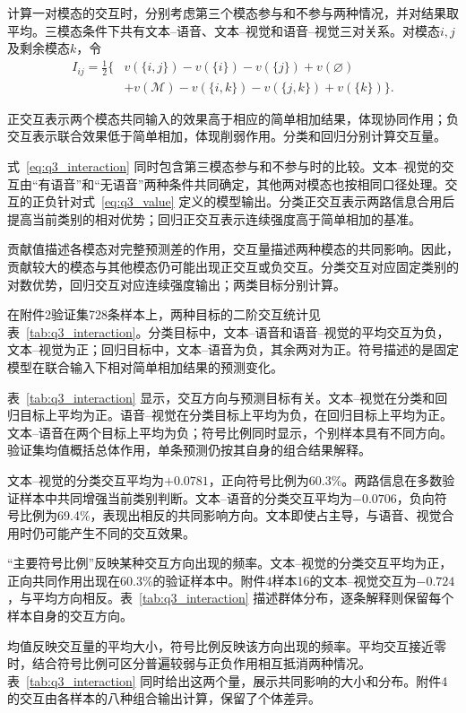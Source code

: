 计算一对模态的交互时，分别考虑第三个模态参与和不参与两种情况，并对结果取平均。三模态条件下共有文本--语音、文本--视觉和语音--视觉三对关系。对模态$i,j$及剩余模态$k$，令
\begin{equation}
\begin{aligned}
I_{ij}=\tfrac12\{&
v(\{i,j\})-v(\{i\})-v(\{j\})+v(\varnothing)\\
&+v(\mathcal M)-v(\{i,k\})-v(\{j,k\})+v(\{k\})\}.
\end{aligned}
\label{eq:q3_interaction}
\end{equation}

正交互表示两个模态共同输入的效果高于相应的简单相加结果，体现协同作用；负交互表示联合效果低于简单相加，体现削弱作用。分类和回归分别计算交互量。

式~\eqref{eq:q3_interaction} 同时包含第三模态参与和不参与时的比较。文本--视觉的交互由“有语音”和“无语音”两种条件共同确定，其他两对模态也按相同口径处理。交互的正负针对式~\eqref{eq:q3_value} 定义的模型输出。分类正交互表示两路信息合用后提高当前类别的相对优势；回归正交互表示连续强度高于简单相加的基准。

贡献值描述各模态对完整预测差的作用，交互量描述两种模态的共同影响。因此，贡献较大的模态与其他模态仍可能出现正交互或负交互。分类交互对应固定类别的对数优势，回归交互对应连续强度输出；两类目标分别计算。

在附件2验证集728条样本上，两种目标的二阶交互统计见表~\ref{tab:q3_interaction}。分类目标中，文本--语音和语音--视觉的平均交互为负，文本--视觉为正；回归目标中，文本--语音为负，其余两对为正。符号描述的是固定模型在联合输入下相对简单相加结果的预测变化。

表~\ref{tab:q3_interaction} 显示，交互方向与预测目标有关。文本--视觉在分类和回归目标上平均为正。语音--视觉在分类目标上平均为负，在回归目标上平均为正。文本--语音在两个目标上平均为负；符号比例同时显示，个别样本具有不同方向。验证集均值概括总体作用，单条预测仍按其自身的组合结果解释。

文本--视觉的分类交互平均为$+0.0781$，正向符号比例为60.3\%。两路信息在多数验证样本中共同增强当前类别判断。文本--语音的分类交互平均为$-0.0706$，负向符号比例为69.4\%，表现出相反的共同影响方向。文本即使占主导，与语音、视觉合用时仍可能产生不同的交互效果。

“主要符号比例”反映某种交互方向出现的频率。文本--视觉的分类交互平均为正，正向共同作用出现在60.3\%的验证样本中。附件4样本16的文本--视觉交互为$-0.724$，与平均方向相反。表~\ref{tab:q3_interaction} 描述群体分布，逐条解释则保留每个样本自身的交互方向。

均值反映交互量的平均大小，符号比例反映该方向出现的频率。平均交互接近零时，结合符号比例可区分普遍较弱与正负作用相互抵消两种情况。表~\ref{tab:q3_interaction} 同时给出这两个量，展示共同影响的大小和分布。附件4的交互由各样本的八种组合输出计算，保留了个体差异。

